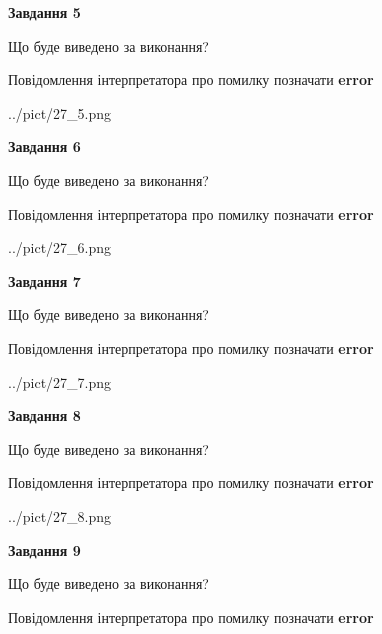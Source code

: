 \documentclass[11pt, ukrainian]{article}
\begin{document}
{\begin {large}
{\begin {center}\textbf{Завдання 5}\end {center}}\par
Що буде виведено за виконання? \par
Повідомлення інтерпретатора про помилку позначати \textbf{error}

\begin{center}
	{../pict/27_5.png}
\end{center}
\newpage

{\begin {center}\textbf{Завдання 6}\end {center}}\par
Що буде виведено за виконання? \par
Повідомлення інтерпретатора про помилку позначати \textbf{error}

\begin{center}
	{../pict/27_6.png}
\end{center}
\newpage

{\begin {center}\textbf{Завдання 7}\end {center}}\par
Що буде виведено за виконання? \par
Повідомлення інтерпретатора про помилку позначати \textbf{error}

\begin{center}
	{../pict/27_7.png}
\end{center}
\newpage

{\begin {center}\textbf{Завдання 8}\end {center}}\par
Що буде виведено за виконання? \par
Повідомлення інтерпретатора про помилку позначати \textbf{error}

\begin{center}
	{../pict/27_8.png}
\end{center}
\newpage

{\begin {center}\textbf{Завдання 9}\end {center}}\par
Що буде виведено за виконання? \par
Повідомлення інтерпретатора про помилку позначати \textbf{error}


\end{large}}
\end{document}
